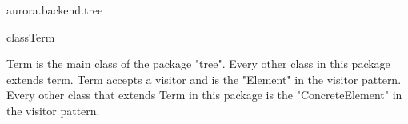\begin{texdocpackage}{aurora.backend.tree}
\begin{texdocclass}{class}{Term}
\label{texdoclet:aurora.backend.tree.Term}
\begin{texdocclassintro}
Term is the main class of the package "tree". Every other class in this package extends term.
 Term accepts a visitor and is the "Element" in the visitor pattern.
 Every other class that extends Term in this package is the "ConcreteElement" in the visitor pattern.\end{texdocclassintro}
\begin{texdocclassconstructors}
\end{texdocclassconstructors}
\begin{texdocclassmethods}
\end{texdocclassmethods}
\end{texdocclass}


\end{texdocpackage}



